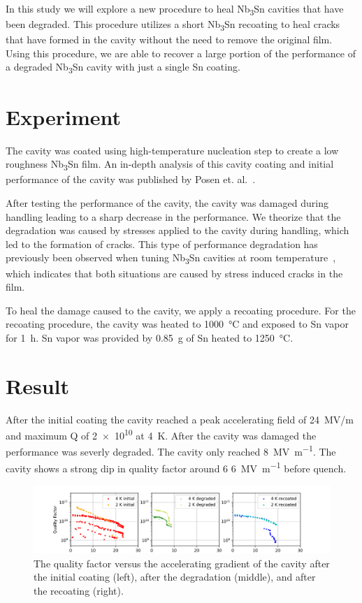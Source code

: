\documentclass[]{revtex4-2}
\begin{document}
In this study we will explore a new procedure to heal Nb\textsubscript{3}Sn cavities that have been degraded. This procedure utilizes a short Nb\textsubscript{3}Sn recoating to heal cracks that have formed in the cavity without the need to remove the original film. Using this procedure, we are able to recover a large portion of the performance of a degraded Nb\textsubscript{3}Sn cavity with just a single Sn coating.


\section{Experiment}
\label{sec:Experiment}

The cavity was coated using high-temperature nucleation step to create a low roughness Nb\textsubscript{3}Sn film. An in-depth analysis of this cavity coating and initial performance of the cavity was published by Posen et. al.~\cite{posen2021advances}. 

After testing the performance of the cavity, the cavity was damaged during handling leading to a sharp decrease in the performance. We theorize that the degradation was caused by stresses applied to the cavity during handling, which led to the formation of cracks. This type of performance degradation has previously been observed when tuning Nb\textsubscript{3}Sn cavities at room temperature~\cite{eremeev:srf2019-mop015}, which indicates that both situations are caused by stress induced cracks in the film.

To heal the damage caused to the cavity, we apply a recoating procedure. For the recoating procedure, the cavity was heated to \qty{1000}{\degreeCelsius} and exposed to Sn vapor for \qty{1}{\hour}. Sn vapor was provided by \qty{0.85}{\gram} of Sn heated to \qty{1250}{\degreeCelsius}.

\section{Result}
\label{sec:Results}

After the initial coating the cavity reached a peak accelerating field of 24~MV/m and maximum Q of \num{2e10} at \qty{4}{\kelvin}. After the cavity was damaged the performance was severly degraded. The cavity only reached \qty{8}{\mega\volt\per\meter}. The cavity shows a strong dip in quality factor around 6 \qty{6}{\mega\volt\per\meter} before quench.

\begin{figure}[h!]%
    \centering%
    \includegraphics[width=1.0\columnwidth]{./figures/VTS.png}%
    \caption{The quality factor versus the accelerating gradient of the cavity after the initial coating (left), after the degradation (middle), and after the recoating (right).}%
    \label{fig:VTS}%
\end{figure}
\end{document}
